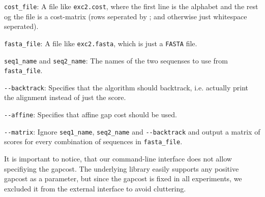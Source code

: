\begin{description}
\item{\verb|cost_file|:} A file like \verb|exc2.cost|, where the
  first line is the alphabet and the rest og the file is a cost-matrix
  (rows seperated by ; and otherwise just whitespace seperated).
\item{\verb|fasta_file|:} A file like \verb|exc2.fasta|, which is just
  a \verb|FASTA| file.
\item{\verb|seq1_name| and \verb|seq2_name|:} The names of the two
  sequenses to use from \verb|fasta_file|.
\item{\verb|--backtrack|:} Specifies that the algorithm should
  backtrack, i.e. actually print the alignment instead of just the
  score.
\item{\verb|--affine|:} Specifies that affine gap cost should be used.
\item{\verb|--matrix|:} Ignore \verb|seq1_name|, \verb|seq2_name| and
  \verb|--backtrack| and output a matrix of scores for every
  combination of sequences in \verb|fasta_file|.
\end{description}

It is important to notice, that our command-line interface does not allow specifiying the gapcost. The underlying library easily supports any positive gapcost as a parameter, but since the gapcost is fixed in all experiments, we excluded it from the external interface to avoid cluttering. 